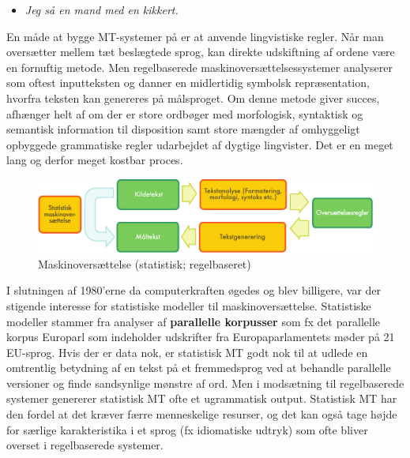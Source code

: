 \begin{multicols}{2}
\begin{itemize}
\item {\it Jeg \mbox{s\aa} en mand med en kikkert.}
\end{itemize}

En m\aa de at bygge MT-systemer \mbox{p\aa} er at anvende lingvi\-stiske regler. N\aa r man overs\ae tter mellem t\ae t besl\ae g\-tede sprog, kan direkte udskiftning af ordene v\ae re en fornuftig metode. Men regelbaserede maskinovers\ae ttelsessystemer analyserer som oftest inputteksten og danner en midlertidig symbolsk repr\ae sentation, hvorfra teksten kan genereres \mbox{p\aa} m\aa lsproget. Om denne metode giver succes, afh\ae nger helt af om der er store ordb\o ger med morfologisk, syntaktisk og semantisk information til disposition samt store m\ae ngder af omhyggeligt opbyggede grammatiske regler udarbejdet af dygtige lingvister. Det er en meget lang og derfor meget kostbar proces.

\begin{figure}[htb]
  \center
  \includegraphics[width=\textwidth]{../_media/danish/machine_translation}
  \caption{Maskinovers\ae ttelse (statistisk; regelbaseret)}
  \label{fig:mtarch_de}
\end{figure}

I slutningen af 1980'erne da computerkraften \o gedes og blev billigere, var der stigende interesse for stati\-stiske modeller til maskinovers\ae ttelse. Statistiske mo\-deller stammer fra analyser af {\bf parallelle korpusser} som fx det parallelle korpus Europarl som indeholder udskrifter fra Europaparlamentets m\o der \mbox{p\aa} 21 EU-sprog. Hvis der er data nok, er statistisk MT godt nok til at udlede en omtrentlig betydning af en tekst \mbox{p\aa} et fremmedsprog ved at behandle parallelle versioner og finde sandsynlige m\o nstre af ord. Men i mods\ae tning til regelbaserede sy\-stemer genererer statistisk MT ofte et ugrammatisk output. Statistisk MT har den fordel at det kr\ae ver f\ae rre menneskelige resurser, og det kan \mbox{ogs\aa} tage h\o jde for s\ae rlige karakteristika i et sprog (fx idiomatiske udtryk) som ofte bliver overset i regelbaserede systemer. 


\end{multicols}
